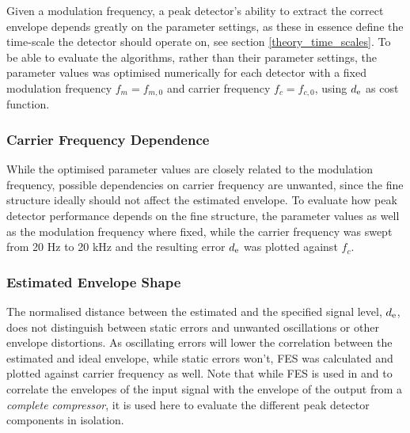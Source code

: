 \documentclass[../main2.tex]{subfiles}
\begin{document}
Given a modulation frequency, a peak detector's ability to extract the correct envelope depends greatly on the parameter settings, as these in essence define the time-scale the detector should operate on, see section \ref{theory_time_scales}. To be able to evaluate the algorithms, rather than their parameter settings, the parameter values was optimised numerically for each detector with a fixed modulation frequency $f_m = f_{m,0}$ and carrier frequency $f_c = f_{c,0}$, using $d_\text{e}$ as cost function.

\subsubsection{Carrier Frequency Dependence}
While the optimised parameter values are closely related to the modulation frequency, possible dependencies on carrier frequency are unwanted, since the fine structure ideally should not affect the estimated envelope. To evaluate how peak detector performance depends on the fine structure, the parameter values as well as the modulation frequency where fixed, while the carrier frequency was swept from 20 Hz to 20 kHz and the resulting error $d_\text{e}$ was plotted against $f_c$.

\subsubsection{Estimated Envelope Shape}
The normalised distance between the estimated and the specified signal level, $d_\text{e}$, does not distinguish between static errors and unwanted oscillations or other envelope distortions. As oscillating errors will lower the correlation between the estimated and ideal envelope, while static errors won't, FES was calculated and plotted against carrier frequency as well. Note that while FES is used in \cite{stone1992syllabic}\cite{stone2007quantifying} and \cite{reiss2012tutorial} to correlate the envelopes of the input signal with the envelope of the output from a \emph{complete compressor}, it is used here to evaluate the different peak detector components in isolation. 
\end{document}
